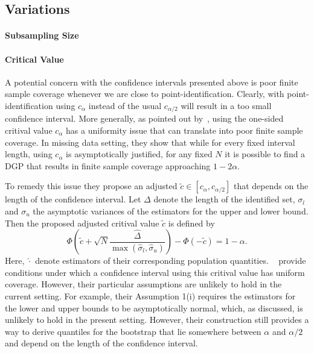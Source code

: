 \documentclass[12pt,a4paper,english]{article} %
\numberwithin{equation}{section}
\theoremstyle{definition}
\theoremstyle{remark}
\theoremstyle{plain}
\begin{document}
\subsection{Variations}

\paragraph{Subsampling Size}

\paragraph{Critical Value}
A potential concern with the confidence intervals presented above is poor finite sample coverage whenever we are close to point-identification.
Clearly, with point-identification using $c_\alpha$ instead of the usual $c_{\alpha/2}$ will result in a too small confidence interval.
More generally, as pointed out by~\cite{imbens2004confidence}, using the one-sided critival value $c_\alpha$ has a uniformity issue that can translate into poor finite sample coverage.
In missing data setting, they show that while for every fixed interval length, using $c_\alpha$ is asymptotically justified, for any fixed $N$ it is possible to find a DGP that results in finite sample coverage approaching $1-2\alpha$.

To remedy this issue they propose an adjusted $\tilde{c}\in[c_{\alpha}, c_{\alpha/2}]$ that depends on the length of the confidence interval.
Let $\Delta$ denote the length of the identified set, $\sigma_l$ and $\sigma_u$ the asymptotic variances of the estimators for the upper and lower bound.
Then the proposed adjusted critival value $\tilde{c}$ is defined by
\begin{equation}\label{eq:imbens_manski_crit}
  \Phi\left(\tilde{c} + \sqrt{N}\frac{\hat{\Delta}}{\max(\hat{\sigma}_l, \hat{\sigma}_u)}\right) - \Phi\left(-\tilde{c}\right) = 1 - \alpha.
\end{equation}
Here, $\hat{\cdot}$ denote estimators of their corresponding population quantities.
~\cite{imbens2004confidence} provide conditions under which a confidence interval using this critival value has uniform coverage.
However, their particular assumptions are unlikely to hold in the current setting.
For example, their Assumption 1(i) requires the estimators for the lower and upper bounds to be asymptotically normal, which, as discussed, is unlikely to hold in the present setting.
However, their construction still provides a way to derive quantiles for the bootstrap that lie somewhere between $\alpha$ and $\alpha/2$ and depend on the length of the confidence interval.
\end{document}
